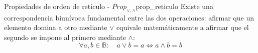 \begin{teorema}{Propiedades de orden de retículo - $Prop_{\vee,\wedge}$}{prop_reticulo}
Existe una correspondencia biunívoca fundamental entre las dos operaciones: afirmar que un elemento domina a otro mediante $\vee$ equivale matemáticamente a afirmar que el segundo se impone al primero mediante $\wedge$:
\[ \forall a, b \in \mathbb{B}: \quad a \vee b = a \iff a \wedge b = b \]
\end{teorema}

